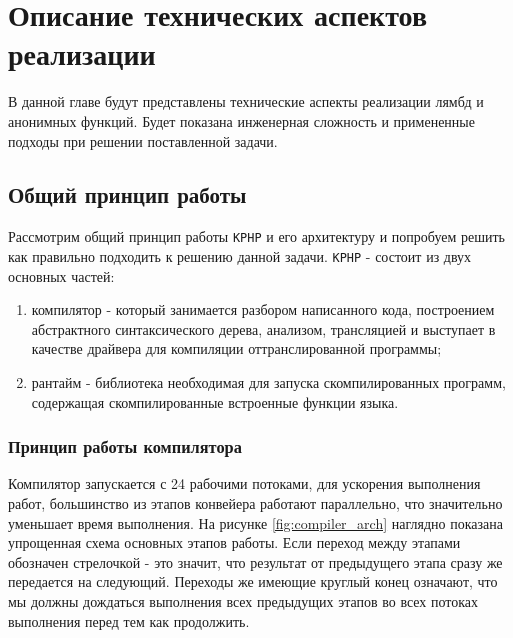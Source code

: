 
\chapter{Описание технических аспектов реализации}
В данной главе будут представлены технические аспекты реализации лямбд и анонимных функций.
Будет показана инженерная сложность и примененные подходы при решении поставленной задачи.

\section{Общий принцип работы}
Рассмотрим общий принцип работы \verb|KPHP| и его архитектуру и попробуем решить как правильно подходить к решению данной задачи.
\verb|KPHP| - состоит из двух основных частей:
\begin{enumerate}
\item компилятор - который занимается разбором написанного кода, построением абстрактного синтаксического дерева, анализом, трансляцией и выступает в качестве драйвера для компиляции оттранслированной программы;
\item рантайм - библиотека необходимая для запуска скомпилированных программ, содержащая скомпилированные встроенные функции языка.
\end{enumerate}

\subsection{Принцип работы компилятора}
Компилятор запускается с 24 рабочими потоками, для ускорения выполнения работ, большинство из этапов конвейера работают параллельно, что значительно уменьшает время выполнения.
На рисунке \ref{fig:compiler_arch} наглядно показана упрощенная схема основных этапов работы.
Если переход между этапами обозначен стрелочкой - это значит, что результат от предыдущего этапа сразу же передается на следующий.
Переходы же имеющие круглый конец означают, что мы должны дождаться выполнения всех предыдущих этапов во всех потоках выполнения перед тем как продолжить.

